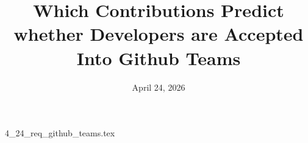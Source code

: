\documentclass{article}      %
\title{Which Contributions Predict whether Developers are Accepted Into Github Teams}  %
\date{April 24, 2026}
\begin{document}

\maketitle                   %



{4_24_req_github_teams.tex}
\printbibliography
\end{document}
